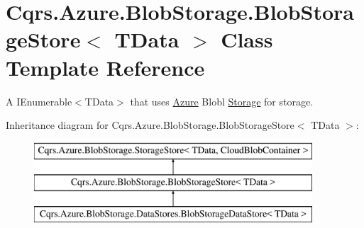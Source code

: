 \hypertarget{classCqrs_1_1Azure_1_1BlobStorage_1_1BlobStorageStore}{}\section{Cqrs.\+Azure.\+Blob\+Storage.\+Blob\+Storage\+Store$<$ T\+Data $>$ Class Template Reference}
\label{classCqrs_1_1Azure_1_1BlobStorage_1_1BlobStorageStore}


A I\+Enumerable$<$\+T\+Data$>$ that uses \hyperlink{namespaceCqrs_1_1Azure}{Azure} Blobl \hyperlink{namespaceCqrs_1_1Azure_1_1Storage}{Storage} for storage.  


Inheritance diagram for Cqrs.\+Azure.\+Blob\+Storage.\+Blob\+Storage\+Store$<$ T\+Data $>$\+:\begin{figure}[H]
\begin{center}
\leavevmode
\includegraphics[height=3.000000cm]{classCqrs_1_1Azure_1_1BlobStorage_1_1BlobStorageStore}
\end{center}
\end{figure}
